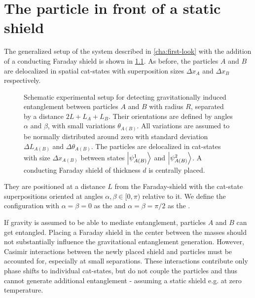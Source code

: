 \chapter{The particle in front of a static shield}\label{cha:entanglement-generation}

The generalized setup of the system described in \cref{cha:first-look} with the addition of a conducting Faraday shield is shown in \cref{fig:4:complete-setup}. As before, the particles $A$ and $B$ are delocalized in spatial cat-states with superposition sizes $\Delta x_A$ and $\Delta x_B$ respectively.
\begin{figure}[!htbp]
  \centering
  \def\svgwidth{\textwidth}
  
  \caption{Schematic experimental setup for detecting gravitationally induced entanglement between particles $A$ and $B$ with radius $R$, separated by a distance $2L + L_A + L_B$. Their orientations are defined by angles $\alpha$ and $\beta$, with small variations $\theta_{A(B)}$. All variations are assumed to be normally distributed around zero with standard deviation $\Delta L_{A(B)}$ and $\Delta \theta_{A(B)}$. The particles are delocalized in cat-states with size $\Delta x_{A(B)}$ between states $\ket{\psi_{A(B)}^1}$ and $\ket{\psi_{A(B)}^2}$. A conducting Faraday shield of thickness $d$ is centrally placed.}
  \label{fig:4:complete-setup}
\end{figure}
They are positioned at a distance $L$ from the Faraday-shield with the cat-state superpositions oriented at angles $\alpha,\beta\in[0,\pi)$ relative to it.
We define the configuration with $\alpha=\beta=0$ as the  and $\alpha = \beta = \pi/2$ as the .

If gravity is assumed to be able to mediate entanglement, particles $A$ and $B$ can get entangled.
Placing a Faraday shield in the center between the masses should not substantially influence the gravitational entanglement generation.
However, Casimir interactions between the newly placed shield and particles must be accounted for, especially at small separations.
These interactions contribute only phase shifts to individual cat-states, but do not couple the particles and thus cannot generate additional entanglement - assuming a static shield e.g. at zero temperature.

